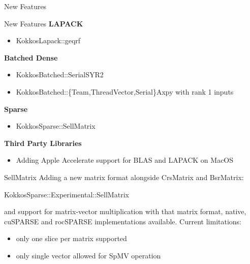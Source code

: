 \begin{frame}[fragile]

  {\Huge New Features}

  \vspace{10pt}

\end{frame}

\begin{frame}[fragile]{New Features}
  \textbf{LAPACK}
  \begin{itemize}
  \item {\ttfamily KokkosLapack::geqrf}
  \end{itemize}
  \textbf{Batched Dense}
  \begin{itemize}
  \item {\ttfamily KokkosBatched::SerialSYR2}
  \item {\ttfamily KokkosBatched::\{Team,ThreadVector,Serial\}Axpy} with rank 1 inputs
  \end{itemize}
  \textbf{Sparse}
  \begin{itemize}
  \item {\ttfamily KokkosSparse::SellMatrix}
  \end{itemize}
  \textbf{Third Party Libraries}
  \begin{itemize}
  \item {\ttfamily Adding Apple Accelerate support for BLAS and LAPACK on MacOS}
  \end{itemize}
\end{frame}

\begin{frame}[fragile]{SellMatrix}
  Adding a new matrix format alongside CrsMatrix and BsrMatrix:
  \begin{center}{\ttfamily KokkosSparse::Experimental::SellMatrix}\end{center}
  and support for matrix-vector multiplication with that matrix format, native, cuSPARSE and rocSPARSE implementations available.
  Current limitations:
  \begin{itemize}
  \item only one slice per matrix supported
  \item only single vector allowed for SpMV operation
  \end{itemize}
\end{frame}
